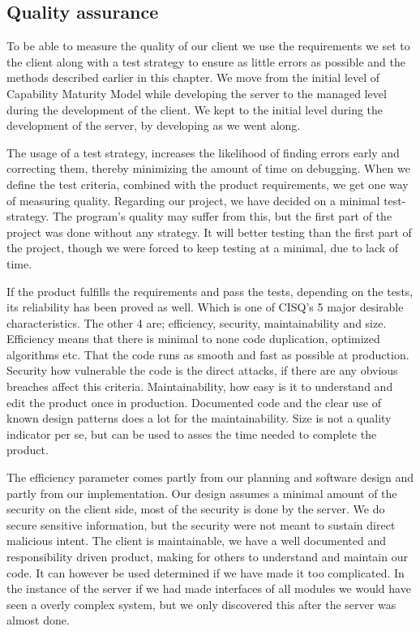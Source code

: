 \subsection{Quality assurance}
To be able to measure the quality of our client we use the requirements we set to the client along with a test strategy to ensure as little errors as possible and the methods described earlier in this chapter. We move from the initial level of Capability Maturity Model while developing the server to the managed level during the development of the client. We kept to the initial level during the development of the server, by developing as we went along.

The usage of a test strategy, increases the likelihood of finding errors early and correcting them, thereby minimizing the amount of time on debugging. When we define the test criteria, combined with the product requirements, we get one way of measuring quality.
Regarding our project, we have decided on a minimal test-strategy. The program's quality may suffer from this, but the first part of the project was done without any strategy. It will better testing than the first part of the project, though we were forced to keep testing at a minimal, due to lack of time.

 If the product fulfills the requirements and pass the tests, depending on the tests, its reliability has been proved as well. Which is one of CISQ's 5 major desirable characteristics. The other 4 are; efficiency, security, maintainability and size.
 Efficiency means that there is minimal to none code duplication, optimized algorithms etc. That the code runs as smooth and fast as possible at production. 
 Security how vulnerable the code is the direct attacks, if there are any obvious breaches affect this criteria.
 Maintainability, how easy is it to understand and edit the product once in production. Documented code and the clear use of known design patterns does a lot for the maintainability. 
 Size is not a quality indicator per se, but can be used to asses the time needed to complete the product.
 
 The efficiency parameter comes partly from our planning and software design and partly from our implementation.
 Our design assumes a minimal amount of the security on the client side, most of the security is done by the server. We do secure sensitive information, but the security were not meant to sustain direct malicious intent.
 The client is maintainable, we have a well documented and responsibility driven product, making for others to understand and maintain our code. 
 It can however be used determined if we have made it too complicated. In the instance of the server if we had made interfaces of all modules we would have seen a overly complex system, but we only discovered this after the server was almost done.
